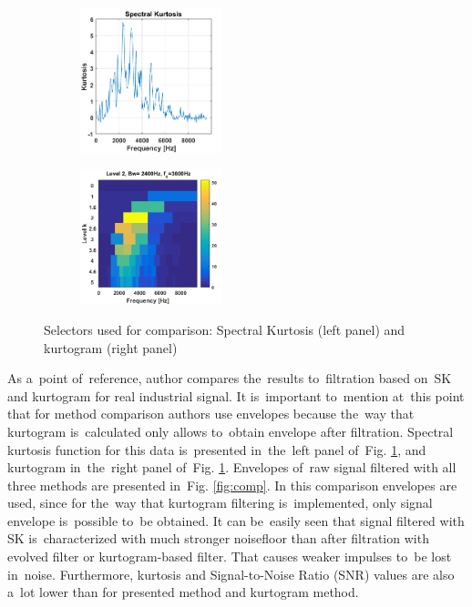 \begin{figure}[!ht]
 \centering
 \begin{subfigure}
   \centering
   \includegraphics[width=0.45\textwidth]{wykresy/SK}
 \end{subfigure}
 \begin{subfigure}
   \centering
		\includegraphics[width=0.45\textwidth]{wykresy/kurtogram}
 \end{subfigure}
 \caption{Selectors used for comparison: Spectral Kurtosis (left panel) and kurtogram (right panel)}
 \label{fig:comps}
\end{figure}


As a~point of~reference, author compares the~results to~filtration based on~SK and kurtogram for real industrial signal. It is~important to~mention at~this point that for method comparison authors use envelopes because the~way that kurtogram is~calculated only allows to~obtain envelope after filtration. Spectral kurtosis function for this data is~presented in~the~left panel of~Fig. \ref{fig:comps}, and kurtogram in~the~right panel of~Fig. \ref{fig:comps}. Envelopes of~raw signal filtered with all three methods are presented in~Fig. \ref{fig:comp}. In this comparison envelopes are used, since for the~way that kurtogram filtering is~implemented, only signal envelope is~possible to~be obtained. It can be~easily seen that signal filtered with SK is~characterized with much stronger noisefloor than after filtration with evolved filter or kurtogram-based filter. That causes weaker impulses to~be lost in~noise. Furthermore, kurtosis and Signal-to-Noise Ratio (SNR) values are also a~lot lower than for presented method and kurtogram method.

